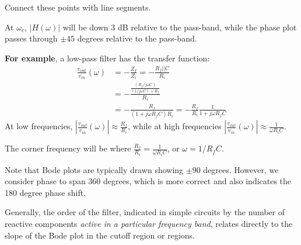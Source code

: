 \documentclass[10pt]{report}
\begin{document}
Connect these points with line segments. 

At $\omega_{c}$, $|H(\omega)|$ will be down 3 dB relative to the
pass-band, while the phase plot passes through $\pm 45$ degrees
relative to the pass-band.

\textbf{For example}, a low-pass filter has the transfer function:
\begin{equation}
\begin{split}
\frac{v_{out}}{v_{in}}(\omega)&= -\frac{Z_{f}}{Z_{i}}=
-\frac{R_{f}||C}{R_{i}}\\ &= -\frac{\frac{(R_{f}/j\omega
C)}{(1/j\omega C)+R_{f}}}{R_{i}}\\ &= -\frac{R_{f}}{(1+j\omega
R_{f}C)R_{i}} = -\frac{R_{f}}{R_{i}}\frac{1}{1+j\omega R_{f}C}
\end{split}
\end{equation}
At low frequencies, $|\frac{v_{out}}{v_{in}}(\omega)| \approx
\frac{R_{f}}{R_{i}}$, while at high frequencies
$|\frac{v_{out}}{v_{in}}(\omega)| \approx \frac{1}{\omega
R_{i}C}$.

The corner frequency will be where $\frac{R_{f}}{R_{i}}=
\frac{1}{\omega R_{i}C}$, or $\omega = 1/R_{f}C$.

Note that Bode plots are typically drawn showing $\pm 90$ degrees.
However, we consider phase to span 360 degrees, which is more correct
and also indicates the 180 degree phase shift.

Generally, the order of the filter, indicated in simple circuits by
the number of reactive components \textit{active in a particular
frequency band}, relates directly to the slope of the Bode plot in the
cutoff region or regions.
\end{document}
